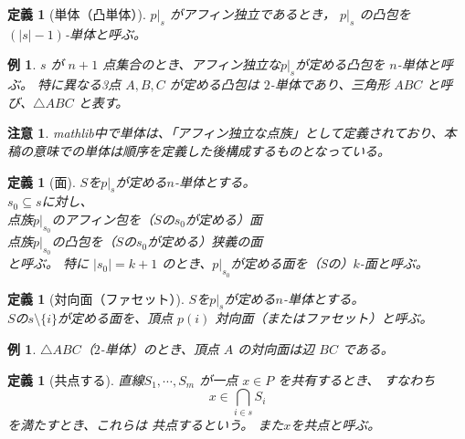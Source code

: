 \documentclass[a4paper,12pt]{bxjsbook}
\theoremstyle{theorem}
\newtheorem{definition}[theorem]{定義}
\newtheorem{example}[theorem]{例}
\newtheorem{remark}[theorem]{注意}
\DeclareMathOperator{\AffHull}{AffHull}
\begin{document}
    \begin{definition}[単体（凸単体）]
        $p|_s$ がアフィン独立であるとき，
        $p|_s$ の凸包を \emph{$(|s|-1)$-単体}と呼ぶ。
    \end{definition}

    \begin{example}
        $s$ が $n+1$ 点集合のとき、アフィン独立な$p|_s$が定める凸包を $n$-単体と呼ぶ。
        特に異なる3点 $A,B,C$ が定める凸包は $2$-単体であり、\emph{三角形 $ABC$} と呼び、$\triangle ABC$ と表す。
    \end{example}

    \begin{remark}
        mathlib中で単体は、「アフィン独立な点族」として定義されており、本稿の意味での単体は順序を定義した後構成するものとなっている。
    \end{remark}

    \begin{definition}[面]
        $S$を$p|_s$が定める$n$-単体とする。\\
        $s_0\subseteq s$に対し、\\
        点族$p|_{s_0}$のアフィン包を（$S$の$s_0$が定める）\emph{面}\\
        点族$p|_{s_0}$の凸包を（$S$の$s_0$が定める）\emph{狭義の面}\\
        と呼ぶ。
        特に $|s_0|=k+1$ のとき、$p|_{s_0}$が定める面を（Sの）\emph{$k$-面}と呼ぶ。
    \end{definition}

    \begin{definition}[対向面（ファセット）]
        $S$を$p|_s$が定める$n$-単体とする。\\
        $S$の$s\setminus \{i\}$が定める面を、頂点 $p(i)$ 対向面（またはファセット）と呼ぶ。
      \end{definition}      

    \begin{example}
        $\triangle ABC$（$2$-単体）のとき、頂点 $A$ の対向面は辺 $BC$ である。
    \end{example}

    \begin{definition}[共点する]
        直線$S_1,\cdots,S_m$ が一点 $x\in P$ を共有するとき、
        すなわち
        \[
          x \in \bigcap_{i\in s} S_i
        \]
        を満たすとき、これらは \emph{共点する}という。
        また$x$を\emph{共点}と呼ぶ。
    \end{definition}

\end{document}
